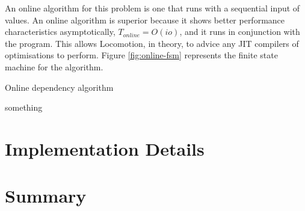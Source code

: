 	An online algorithm for this problem is one that runs with a sequential input of values. An online algorithm is superior because it shows better performance characteristics asymptotically, $T_{online} = O(io)$, and it runs in conjunction with the program. This allows Locomotion, in theory, to advice any JIT compilers of optimisations to perform. Figure \ref{fig:online-fsm} represents the finite state machine for the algorithm.
	
	\begin{algorithm}
		\caption{Online dependency algorithm}
		\label{alg:online-dependency}
		\begin{algorithmic}
			\STATE something
		\end{algorithmic}
	\end{algorithm}

\section{Implementation Details} \label{sec:runtime/implementation}

\section{Summary} \label{sec:runtime/summary}